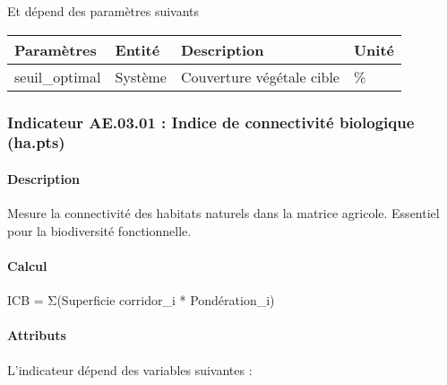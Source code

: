\documentclass[
]{article}
\newenvironment{Shaded}{\begin{snugshade}}{\end{snugshade}}
\newcommand{\NormalTok}[1]{#1}
\begin{document}
Et dépend des paramètres suivants

\begin{longtable}[]{@{}llll@{}}
\toprule\noalign{}
\textbf{Paramètres} & \textbf{Entité} & \textbf{Description} &
\textbf{Unité} \\
\midrule\noalign{}
\endhead
\bottomrule\noalign{}
\endlastfoot
seuil\_optimal & Système & Couverture végétale cible & \% \\
\end{longtable}

\subsubsection{Indicateur AE.03.01 : Indice de connectivité biologique
(ha.pts)}\label{indicateur-ae.03.01-indice-de-connectivituxe9-biologique-ha.pts}

\paragraph{Description}\label{description-10}

Mesure la connectivité des habitats naturels dans la matrice agricole.
Essentiel pour la biodiversité fonctionnelle.

\paragraph{Calcul}\label{calcul-10}

\begin{Shaded}
\begin{Highlighting}[]
\NormalTok{ICB = Σ(Superficie corridor\_i * Pondération\_i)}
\end{Highlighting}
\end{Shaded}

\paragraph{Attributs}\label{attributs-28}

L'indicateur dépend des variables suivantes :
\end{document}
